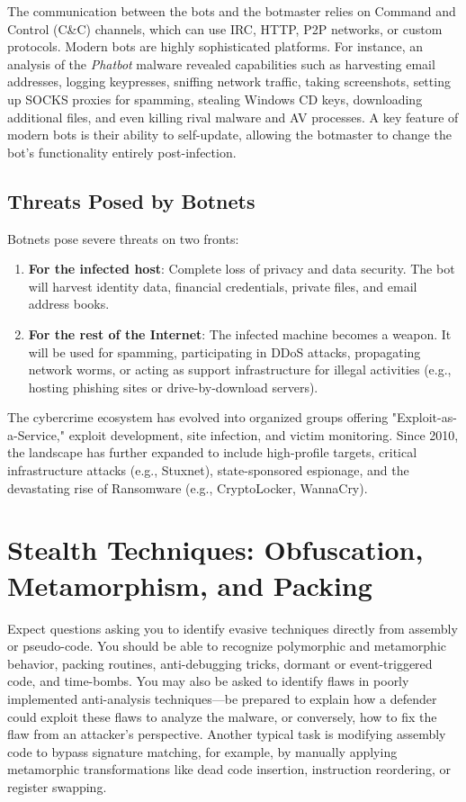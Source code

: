 The communication between the bots and the botmaster relies on Command and Control (C\&C) channels, which can use IRC, HTTP, P2P networks, or custom protocols. Modern bots are highly sophisticated platforms. For instance, an analysis of the \textit{Phatbot} malware revealed capabilities such as harvesting email addresses, logging keypresses, sniffing network traffic, taking screenshots, setting up SOCKS proxies for spamming, stealing Windows CD keys, downloading additional files, and even killing rival malware and AV processes. A key feature of modern bots is their ability to self-update, allowing the botmaster to change the bot's functionality entirely post-infection.

\subsection{Threats Posed by Botnets}
Botnets pose severe threats on two fronts:
\begin{enumerate}
    \item \textbf{For the infected host}: Complete loss of privacy and data security. The bot will harvest identity data, financial credentials, private files, and email address books.
    \item \textbf{For the rest of the Internet}: The infected machine becomes a weapon. It will be used for spamming, participating in DDoS attacks, propagating network worms, or acting as support infrastructure for illegal activities (e.g., hosting phishing sites or drive-by-download servers).
\end{enumerate}

The cybercrime ecosystem has evolved into organized groups offering "Exploit-as-a-Service," exploit development, site infection, and victim monitoring. Since 2010, the landscape has further expanded to include high-profile targets, critical infrastructure attacks (e.g., Stuxnet), state-sponsored espionage, and the devastating rise of Ransomware (e.g., CryptoLocker, WannaCry).

\section{Stealth Techniques: Obfuscation, Metamorphism, and Packing}

\begin{tcolorbox}[colback=blue!5!white,colframe=blue!75!black,title=Exam Insight]
Expect questions asking you to identify evasive techniques directly from assembly or pseudo-code. You should be able to recognize polymorphic and metamorphic behavior, packing routines, anti-debugging tricks, dormant or event-triggered code, and time-bombs. You may also be asked to identify flaws in poorly implemented anti-analysis techniques—be prepared to explain how a defender could exploit these flaws to analyze the malware, or conversely, how to fix the flaw from an attacker's perspective. Another typical task is modifying assembly code to bypass signature matching, for example, by manually applying metamorphic transformations like dead code insertion, instruction reordering, or register swapping.
\end{tcolorbox}

